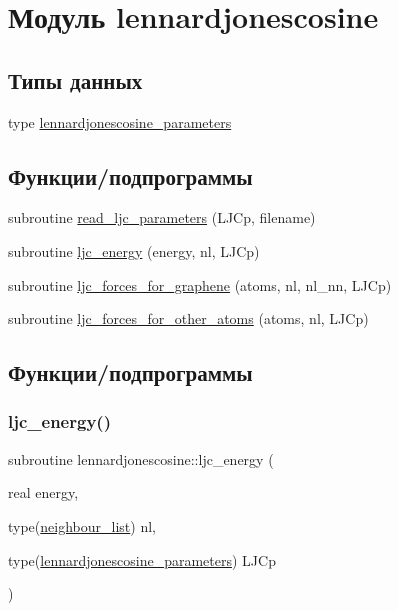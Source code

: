 \hypertarget{namespacelennardjonescosine}{}\section{Модуль lennardjonescosine}
\label{namespacelennardjonescosine}
\subsection*{Типы данных}
\begin{DoxyCompactItemize}
\item 
type \mbox{\hyperlink{structlennardjonescosine_1_1lennardjonescosine__parameters}{lennardjonescosine\+\_\+parameters}}
\end{DoxyCompactItemize}
\subsection*{Функции/подпрограммы}
\begin{DoxyCompactItemize}
\item 
subroutine \mbox{\hyperlink{namespacelennardjonescosine_abdcce4a33286a32fa7d04e2fd1344934}{read\+\_\+ljc\+\_\+parameters}} (L\+J\+Cp, filename)
\item 
subroutine \mbox{\hyperlink{namespacelennardjonescosine_a50bfc170eedcf42dd2252426f2476002}{ljc\+\_\+energy}} (energy, nl, L\+J\+Cp)
\item 
subroutine \mbox{\hyperlink{namespacelennardjonescosine_aa355c58f69eacc410be4c84a216f9aeb}{ljc\+\_\+forces\+\_\+for\+\_\+graphene}} (atoms, nl, nl\+\_\+nn, L\+J\+Cp)
\item 
subroutine \mbox{\hyperlink{namespacelennardjonescosine_a73608f731b0cb701778f6b125e057ab4}{ljc\+\_\+forces\+\_\+for\+\_\+other\+\_\+atoms}} (atoms, nl, L\+J\+Cp)
\end{DoxyCompactItemize}


\subsection{Функции/подпрограммы}
\mbox{\label{namespacelennardjonescosine_a50bfc170eedcf42dd2252426f2476002}} 
\subsubsection{\texorpdfstring{ljc\+\_\+energy()}{ljc\_energy()}}
{\footnotesize\ttfamily subroutine lennardjonescosine\+::ljc\+\_\+energy (\begin{DoxyParamCaption}\item[{real}]{energy,  }\item[{type(\mbox{\hyperlink{structmd__general_1_1neighbour__list}{neighbour\+\_\+list}})}]{nl,  }\item[{type(\mbox{\hyperlink{structlennardjonescosine_1_1lennardjonescosine__parameters}{lennardjonescosine\+\_\+parameters}})}]{L\+J\+Cp }\end{DoxyParamCaption})}



